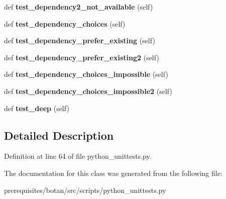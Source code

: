 \begin{DoxyCompactItemize}
def {\bfseries test\+\_\+dependency2\+\_\+not\+\_\+available} (self)
\item 
\mbox{\label{classpython__unittests_1_1_modules_chooser_resolve_dependencies_acac6b4eca8ce13cb10b6fd07414ec2d3}} 
def {\bfseries test\+\_\+dependency\+\_\+choices} (self)
\item 
\mbox{\label{classpython__unittests_1_1_modules_chooser_resolve_dependencies_a2389769d3312977b27fc6aa7d1a0a05d}} 
def {\bfseries test\+\_\+dependency\+\_\+prefer\+\_\+existing} (self)
\item 
\mbox{\label{classpython__unittests_1_1_modules_chooser_resolve_dependencies_a0cebc97e1679bc10b781716ac0cf6d68}} 
def {\bfseries test\+\_\+dependency\+\_\+prefer\+\_\+existing2} (self)
\item 
\mbox{\label{classpython__unittests_1_1_modules_chooser_resolve_dependencies_ae0770ebb97fc38a5ef647cdc58966b4e}} 
def {\bfseries test\+\_\+dependency\+\_\+choices\+\_\+impossible} (self)
\item 
\mbox{\label{classpython__unittests_1_1_modules_chooser_resolve_dependencies_a44a89c14b7c537a6cfdfe50b404c755b}} 
def {\bfseries test\+\_\+dependency\+\_\+choices\+\_\+impossible2} (self)
\item 
\mbox{\label{classpython__unittests_1_1_modules_chooser_resolve_dependencies_abba03d3ec16377a24dac8e28756cfed9}} 
def {\bfseries test\+\_\+deep} (self)
\end{DoxyCompactItemize}


\subsection{Detailed Description}


Definition at line 64 of file python\+\_\+unittests.\+py.



The documentation for this class was generated from the following file\+:\begin{DoxyCompactItemize}
\item 
prerequisites/botan/src/scripts/python\+\_\+unittests.\+py\end{DoxyCompactItemize}

